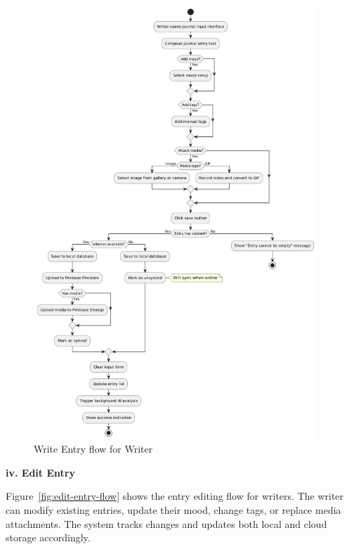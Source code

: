 \begin{figure}[H]
\centering
\includegraphics[width=0.95\textwidth,height=0.7\textheight,keepaspectratio]{files/imgs/write_entry_flow.png}
\caption{Write Entry flow for Writer}
\label{fig:write-entry-flow}
\end{figure}
\clearpage

\textbf{iv. Edit Entry}


Figure~\ref{fig:edit-entry-flow} shows the entry editing flow for writers. The writer can modify existing entries, update their mood, change tags, or replace media attachments. The system tracks changes and updates both local and cloud storage accordingly.

